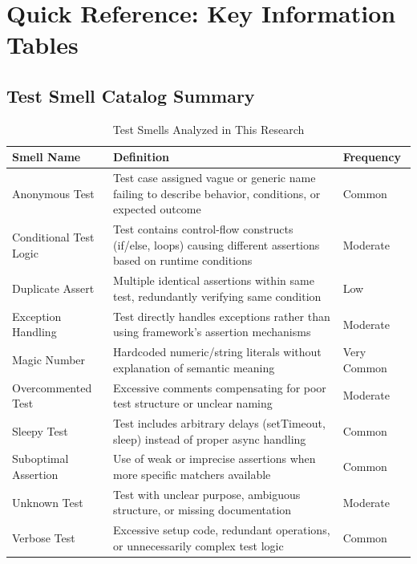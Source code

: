 
\section{Quick Reference: Key Information Tables}
\label{sec:quick-reference}

\subsection{Test Smell Catalog Summary}

\begin{table}[h]
\centering
\caption{Test Smells Analyzed in This Research}
\label{tab:smell-catalog}
\small
\begin{tabular}{@{}p{3.5cm}p{7cm}p{2.5cm}@{}}
\toprule
\textbf{Smell Name} & \textbf{Definition} & \textbf{Frequency} \\ \midrule
Anonymous Test & Test case assigned vague or generic name failing to describe behavior, conditions, or expected outcome & Common \\
\addlinespace
Conditional Test Logic & Test contains control-flow constructs (if/else, loops) causing different assertions based on runtime conditions & Moderate \\
\addlinespace
Duplicate Assert & Multiple identical assertions within same test, redundantly verifying same condition & Low \\
\addlinespace
Exception Handling & Test directly handles exceptions rather than using framework's assertion mechanisms & Moderate \\
\addlinespace
Magic Number & Hardcoded numeric/string literals without explanation of semantic meaning & Very Common \\
\addlinespace
Overcommented Test & Excessive comments compensating for poor test structure or unclear naming & Moderate \\
\addlinespace
Sleepy Test & Test includes arbitrary delays (setTimeout, sleep) instead of proper async handling & Common \\
\addlinespace
Suboptimal Assertion & Use of weak or imprecise assertions when more specific matchers available & Common \\
\addlinespace
Unknown Test & Test with unclear purpose, ambiguous structure, or missing documentation & Moderate \\
\addlinespace
Verbose Test & Excessive setup code, redundant operations, or unnecessarily complex test logic & Common \\ \bottomrule
\end{tabular}
\end{table}

